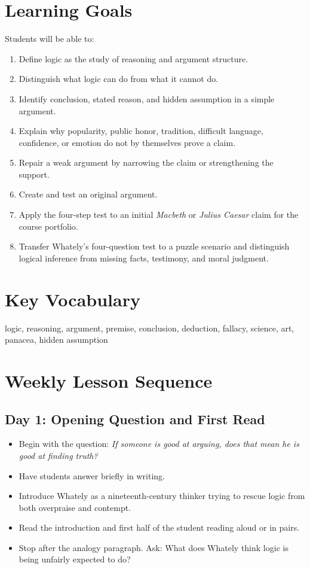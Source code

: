 \documentclass[12pt]{article}
\begin{document}
\section*{Learning Goals}
Students will be able to:
\begin{enumerate}[leftmargin=*]
\item Define logic as the study of reasoning and argument structure.
\item Distinguish what logic can do from what it cannot do.
\item Identify conclusion, stated reason, and hidden assumption in a simple argument.
\item Explain why popularity, public honor, tradition, difficult language, confidence, or emotion do not by themselves prove a claim.
\item Repair a weak argument by narrowing the claim or strengthening the support.
\item Create and test an original argument.
\item Apply the four-step test to an initial \textit{Macbeth} or \textit{Julius Caesar} claim for the course portfolio.
\item Transfer Whately's four-question test to a puzzle scenario and distinguish logical inference from missing facts, testimony, and moral judgment.
\end{enumerate}

\section*{Key Vocabulary}
logic, reasoning, argument, premise, conclusion, deduction, fallacy, science, art, panacea, hidden assumption

\section*{Weekly Lesson Sequence}
\subsection*{Day 1: Opening Question and First Read}
\begin{itemize}[leftmargin=*]
\item Begin with the question: \textit{If someone is good at arguing, does that mean he is good at finding truth?}
\item Have students answer briefly in writing.
\item Introduce Whately as a nineteenth-century thinker trying to rescue logic from both overpraise and contempt.
\item Read the introduction and first half of the student reading aloud or in pairs.
\item Stop after the analogy paragraph. Ask: What does Whately think logic is being unfairly expected to do?
\end{itemize}
\end{document}

